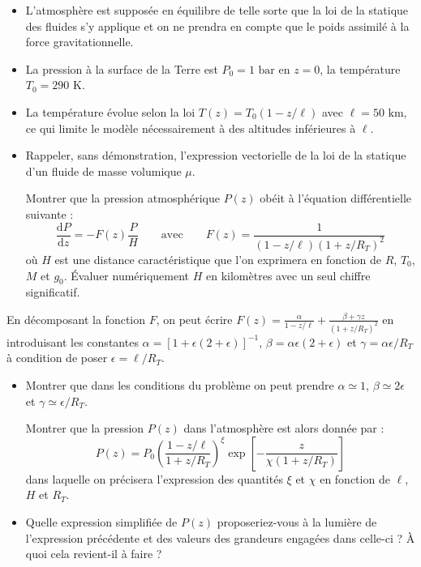 \begin{itemize}
    \item L'atmosphère est supposée en équilibre de telle sorte que la loi de la statique des fluides s'y applique et on ne prendra en compte que le poids assimilé à la force gravitationnelle.
    \item La pression à la surface de la Terre est $P_0 = 1\text{ bar}$ en $z = 0$, la température $T_0 = 290\text{ K}$.
    \item La température évolue selon la loi $T(z) = T_0(1 - z/\ell)$ avec $\ell = 50\text{ km}$, ce qui limite le modèle nécessairement à des altitudes inférieures à $\ell$.
\end{itemize}

\begin{itemize}
    \item[8.] Rappeler, sans démonstration, l'expression vectorielle de la loi de la statique d'un fluide de masse volumique $\mu$.
    
    Montrer que la pression atmosphérique $P(z)$ obéit à l'équation différentielle suivante :
    \begin{equation*}
        \frac{\mathrm{d}P}{\mathrm{d}z} = -F(z)\frac{P}{H} \qquad \text{avec} \qquad F(z) = \frac{1}{(1 - z/\ell)\left(1 + z/R_T\right)^2}
    \end{equation*}
    où $H$ est une distance caractéristique que l'on exprimera en fonction de $R$, $T_0$, $M$ et $g_0$. Évaluer numériquement $H$ en kilomètres avec un seul chiffre significatif.
\end{itemize}

En décomposant la fonction $F$, on peut écrire $F(z) = \frac{\alpha}{1 - z/\ell} + \frac{\beta + \gamma z}{\left(1 + z/R_T\right)^2}$ en introduisant les constantes $\alpha = [1 + \epsilon(2 + \epsilon)]^{-1}$, $\beta = \alpha\epsilon(2 + \epsilon)$ et $\gamma = \alpha\epsilon/R_T$ à condition de poser $\epsilon = \ell/R_T$.

\begin{itemize}
    \item[9.] Montrer que dans les conditions du problème on peut prendre $\alpha \simeq 1$, $\beta \simeq 2\epsilon$ et $\gamma \simeq \epsilon/R_T$.
    
    Montrer que la pression $P(z)$ dans l'atmosphère est alors donnée par :
    \begin{equation}
        P(z) = P_0 \left(\frac{1 - z/\ell}{1 + z/R_T}\right)^\xi \exp\left[-\frac{z}{\chi(1 + z/R_T)}\right]
    \end{equation}
    dans laquelle on précisera l'expression des quantités $\xi$ et $\chi$ en fonction de $\ell$, $H$ et $R_T$.
    
    \item[10.] Quelle expression simplifiée de $P(z)$ proposeriez-vous à la lumière de l'expression précédente et des valeurs des grandeurs engagées dans celle-ci ? À quoi cela revient-il à faire ?
\end{itemize}

